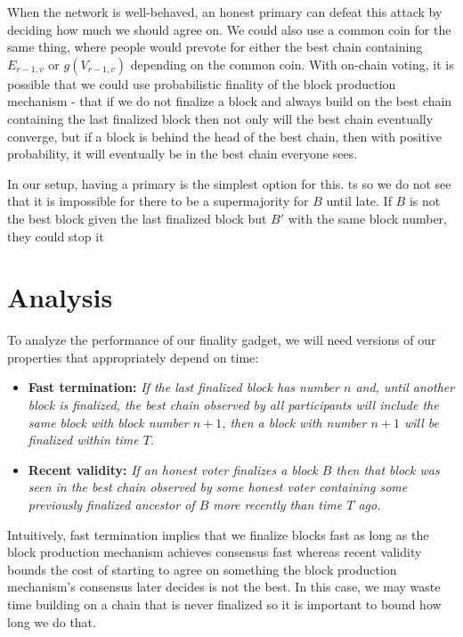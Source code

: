 \documentclass[a4paper,UKenglish,cleveref, autoref, thm-restate, anonymous]{lipics-v2019}
\begin{document}
{When the network is well-behaved, an honest primary can defeat this attack by deciding how much we should agree on. We could also use a common coin for the same thing, where people would prevote for either the best chain containing $E_{r-1,v}$ or $g(V_{r-1,v})$ depending on the common coin.
With on-chain voting, it is possible that we could use probabilistic finality of the block production mechanism - that if we do not finalize a block and always build on the best chain containing the last finalized block then not only will the best chain eventually converge, but if a block is behind the head of the best chain, then with positive probability, it will eventually be in the best chain everyone sees.

In our setup, having a primary is the simplest option for this.
ts so we do not see that it is impossible for there to be a supermajority for $B$ until late. 
If $B$ is not the best block given the last finalized block but $B'$  with the same block number, they could stop it

}



\section{ Analysis }


To analyze the performance of our finality gadget, we will need versions of our properties that appropriately depend on time: 

\begin{itemize}
\item{\bf Fast termination:} {\em If the last finalized block has number $n$ and, until another block is finalized, the best chain observed by all participants will include the same block with block number $n+1$, then a block with number $n+1$ will be finalized within time $T$.}
\item{\bf Recent validity:} {\em If an honest voter finalizes a block $B$ then that block was seen in the best chain observed by some honest voter containing some previously finalized ancestor of $B$ more recently than time $T$ ago.}
\end{itemize}

Intuitively, fast termination implies that we finalize blocks fast as long as the block production mechanism achieves consensus fast whereas recent validity bounds the cost of starting to agree on something the block production mechanism's consensus later decides is not the best. In this case, we may waste time building on a chain that is never finalized so it is important to bound how long we do that.
\end{document}
